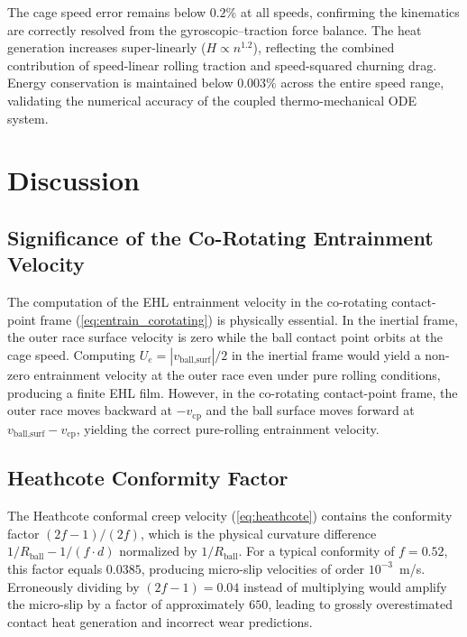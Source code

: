 \documentclass[preprint,12pt]{elsarticle}
\begin{document}
The cage speed error remains below $0.2\%$ at all speeds, confirming the kinematics are correctly resolved from the gyroscopic--traction force balance. The heat generation increases super-linearly ($H \propto n^{1.2}$), reflecting the combined contribution of speed-linear rolling traction and speed-squared churning drag. Energy conservation is maintained below $0.003\%$ across the entire speed range, validating the numerical accuracy of the coupled thermo-mechanical ODE system.


\section{Discussion}
\label{sec:discussion}

\subsection{Significance of the Co-Rotating Entrainment Velocity}

The computation of the EHL entrainment velocity in the co-rotating contact-point frame (\cref{eq:entrain_corotating}) is physically essential. In the inertial frame, the outer race surface velocity is zero while the ball contact point orbits at the cage speed. Computing $U_e = |v_{\text{ball,surf}}|/2$ in the inertial frame would yield a non-zero entrainment velocity at the outer race even under pure rolling conditions, producing a finite EHL film. However, in the co-rotating contact-point frame, the outer race moves backward at $-v_{\text{cp}}$ and the ball surface moves forward at $v_{\text{ball,surf}} - v_{\text{cp}}$, yielding the correct pure-rolling entrainment velocity.

\subsection{Heathcote Conformity Factor}

The Heathcote conformal creep velocity (\cref{eq:heathcote}) contains the conformity factor $(2f-1)/(2f)$, which is the physical curvature difference $1/R_{\text{ball}} - 1/(f \cdot d)$ normalized by $1/R_{\text{ball}}$. For a typical conformity of $f = 0.52$, this factor equals $0.0385$, producing micro-slip velocities of order $10^{-3}$~m/s. Erroneously dividing by $(2f-1) = 0.04$ instead of multiplying would amplify the micro-slip by a factor of approximately $650$, leading to grossly overestimated contact heat generation and incorrect wear predictions.
\end{document}
